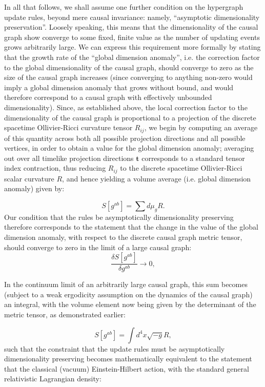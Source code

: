 \documentclass{article}
\begin{document}
In all that follows, we shall assume one further condition on the hypergraph update rules, beyond mere causal invariance: namely, ``asymptotic dimensionality preservation''. Loosely speaking, this means that the dimensionality of the causal graph show converge to some fixed, finite value as the number of updating events grows arbitrarily large. We can express this requirement more formally by stating that the growth rate of the ``global dimension anomaly'', i.e. the correction factor to the global dimensionality of the causal graph, should converge to zero as the size of the causal graph increases (since converging to anything non-zero would imply a global dimension anomaly that grows without bound, and would therefore correspond to a causal graph with effectively unbounded dimensionality). Since, as established above, the local correction factor to the dimensionality of the causal graph is proportional to a projection of the discrete spacetime Ollivier-Ricci curvature tensor ${R_{i j}}$, we begin by computing an average of this quantity across both all possible projection directions and all possible vertices, in order to obtain a value for the global dimension anomaly; averaging out over all timelike projection directions ${\mathbf{t}}$ corresponds to a standard tensor index contraction, thus reducing ${R_{i j}}$ to the discrete spacetime Ollivier-Ricci scalar curvature $R$, and hence yielding a volume average (i.e. global dimension anomaly) given by:

\begin{equation}
S \left[ g^{a b} \right] = \sum d \mu_g R.
\end{equation}
Our condition that the rules be asymptotically dimensionality preserving therefore corresponds to the statement that the change in the value of the global dimension anomaly, with respect to the discrete causal graph metric tensor, should converge to zero in the limit of a large causal graph:
\begin{equation}
\frac{\delta S \left[ g^{a b} \right]}{\delta g^{a b}} \to 0,
\end{equation}

In the continuum limit of an arbitrarily large causal graph, this sum becomes (subject to a weak ergodicity assumption on the dynamics of the causal graph) an integral, with the volume element now being given by the determinant of the metric tensor, as demonstrated earlier:

\begin{equation}
S \left[ g^{a b} \right] = \int d^4 x \sqrt{- g} R,
\end{equation}
such that the constraint that the update rules must be asymptotically dimensionality preserving becomes mathematically equivalent to the statement that the classical (vacuum) Einstein-Hilbert action\cite{hilbert}, with the standard general relativistic Lagrangian density:
\end{document}
